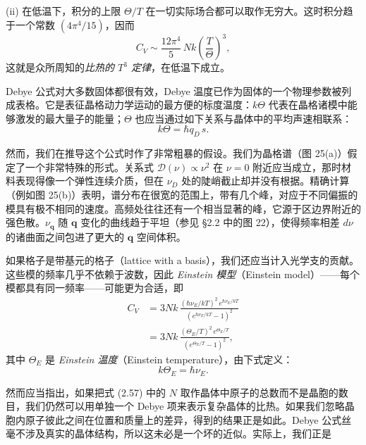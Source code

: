 (ii) 在低温下，积分的上限 $\Theta/T$ 在一切实际场合都可以取作无穷大。这时积分趋于一个常数 $(4\pi^4/15)$，因而
\begin{equation*}
C_V \sim \frac{12\pi^4}{5}\, Nk \left(\frac{T}{\Theta}\right)^3,
\tag{2.61}
\end{equation*}
这就是众所周知的\emph{比热的 $T^3$ 定律}，在低温下成立。

Debye 公式对大多数固体都很有效，Debye 温度已作为固体的一个物理参数被列成表格。它是表征晶格动力学运动的最方便的标度温度：$k\Theta$ 代表在晶格诸模中能够激发的最大量子的能量；$\Theta$ 也应当通过如下关系与晶体中的平均声速相联系：
\begin{equation*}
k\Theta = \hbar q_D\, s.
\tag{2.62}
\end{equation*}

然而，我们在推导这个公式时作了非常粗暴的假设。我们为晶格谱（图 25(a)）假定了一个非常特殊的形式。关系式 $\mathcal{D}(\nu)\propto\nu^2$ 在 $\nu=0$ 附近应当成立，那时材料表现得像一个弹性连续介质，但在
$\nu_D$ 处的陡峭截止却并没有根据。精确计算（例如图 25(b)）表明，谱分布在很宽的范围上，带有几个峰，对应于不同偏振的模具有极不相同的速度。高频处往往还有一个相当显著的峰，它源于区边界附近的强色散。$\nu_{\mathbf{q}}$ 随 $\mathbf{q}$ 变化的曲线趋于平坦（参见 §2.2 中的图 22），使得频率相差 $d\nu$ 的诸曲面之间包进了更大的 $\mathbf{q}$ 空间体积。

如果格子是带基元的格子（lattice with a basis），我们还应当计入光学支的贡献。这些模的频率几乎不依赖于波数，因此 \emph{Einstein 模型}（Einstein model）——每个模都具有同一频率——可能更为合适，即
\begin{align*}
C_V &= 3Nk\,\frac{(\hbar\nu_E/kT)^2\, e^{\hbar\nu_E/kT}}{(e^{\hbar\nu_E/kT}-1)^2} \\
&= 3Nk\,\frac{(\Theta_E/T)^2\, e^{\Theta_E/T}}{(e^{\Theta_E/T}-1)^2},
\tag{2.63}
\end{align*}
其中 $\Theta_E$ 是 \emph{Einstein 温度}（Einstein temperature），由下式定义：
\begin{equation*}
k\Theta_E = \hbar\nu_E.
\tag{2.64}
\end{equation*}

然而应当指出，如果把式 (2.57) 中的 $N$ 取作晶体中原子的总数而不是晶胞的数目，我们仍然可以用单独一个 Debye 项来表示复杂晶体的比热。如果我们忽略晶胞内原子彼此之间在位置和质量上的差异，得到的结果正是如此。Debye 公式丝毫不涉及真实的晶体结构，所以这未必是一个坏的近似。实际上，我们正是

